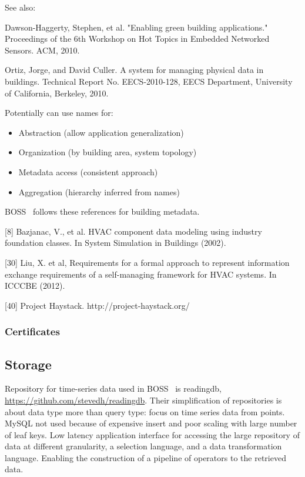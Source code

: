 
See also: 

Dawson-Haggerty, Stephen, et al. "Enabling green building applications." Proceedings of the 6th Workshop on Hot Topics in Embedded Networked Sensors. ACM, 2010.

Ortiz, Jorge, and David Culler. A system for managing physical data in buildings. Technical Report No. EECS-2010-128, EECS Department, University of California, Berkeley, 2010.

Potentially can use names for:
\begin{itemize}
\item Abstraction (allow application generalization)
\item Organization (by building area, system topology) 
\item Metadata access (consistent approach)
\item Aggregation (hierarchy inferred from names) 
\end{itemize} 



BOSS~\cite{Dawson-Haggerty2013BOSS} follows these references for building metadata. 

[8] Bazjanac, V., et al. HVAC component data modeling using industry foundation classes. In System Simulation in Buildings (2002). 

[30] Liu, X. et al, Requirements for a formal approach to represent information exchange requirements of a self-managing framework for HVAC systems. In ICCCBE (2012). 

[40] Project Haystack. http://project-haystack.org/  


\subsubsection{Certificates}

\subsection{Storage}

Repository for time-series data used in BOSS~\cite{Dawson-Haggerty2013BOSS} is readingdb, \url{https://github.com/stevedh/readingdb}.
Their simplification of repositories is about data type more than query type:  focus on time series data from points. 
MySQL not used because of expensive insert and poor scaling with large number of leaf keys.
Low latency application interface for accessing the large repository of data at different granularity, a selection language, and a data transformation language. Enabling the construction of a pipeline of operators to the retrieved data. 

